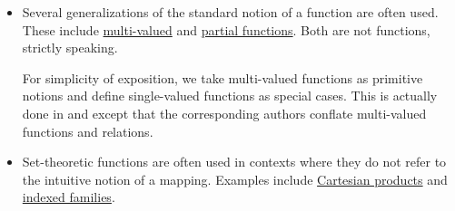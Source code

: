 \begin{remark}
\begin{itemize}
    \item Several generalizations of the standard notion of a function are often used. These include \hyperref[def:multi_valued_function]{multi-valued} and \hyperref[def:partial_function]{partial functions}. Both are not functions, strictly speaking.

    For simplicity of exposition, we take multi-valued functions as primitive notions and define single-valued functions as special cases. This is actually done in \cite[def. 2.31]{OpenLogicFull} and \cite[8]{Kelley1955} except that the corresponding authors conflate multi-valued functions and relations.

    \item Set-theoretic functions are often used in contexts where they do not refer to the intuitive notion of a mapping. Examples include \hyperref[def:cartesian_product]{Cartesian products} and \hyperref[def:indexed_family]{indexed families}.
  \end{itemize}
\end{remark}

